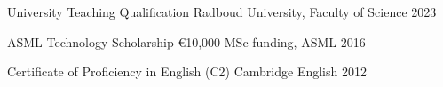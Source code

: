 

\begin{cvhonors}

  \cvhonor
    {University Teaching Qualification} %
    {Radboud University, Faculty of Science} %
    {} %
    {2023} %

  \cvhonor
    {ASML Technology Scholarship} %
    {€10,000 MSc funding, ASML} %
    {} %
    {2016} %

  \cvhonor
    {Certificate of Proficiency in English (C2)} %
    {Cambridge English} %
    {} %
    {2012} %

\end{cvhonors}
